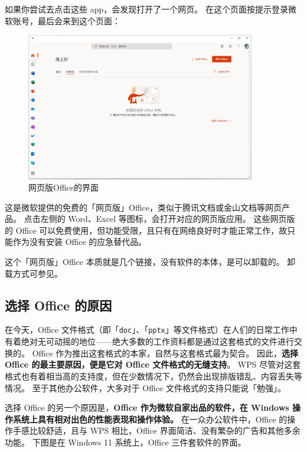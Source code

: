 如果你尝试去点击这些 app，会发现打开了一个网页。
在这个页面按提示登录微软账号，最后会来到这个页面：

\begin{figure}[htb!]
  \centering
  \includegraphics[width=10cm]{assets/Office_Web.png}
  \caption{网页版Office的界面}
  \label{Office_Web}
\end{figure}

这是微软提供的免费的「网页版」Office，类似于腾讯文档或金山文档等网页产品。
点击左侧的 Word、Excel 等图标，会打开对应的网页版应用。
这些网页版的 Office 可以免费使用，但功能受限，且只有在网络良好时才能正常工作，故只能作为没有安装 Office 的应急替代品。

这个「网页版」Office 本质就是几个链接，没有软件的本体，是可以卸载的。
卸载方式可参见。

\subsection{选择 Office 的原因}

在今天，Office 文件格式（即「\verb|doc|」、「\verb|pptx|」等文件格式）在人们的日常工作中有着绝对无可动摇的地位——绝大多数的工作资料都是通过这套格式的文件进行交换的。
Office 作为推出这套格式的本家，自然与这套格式最为契合。
因此，\textbf{选择 Office 的最主要原因，便是它对 Office 文件格式的无缝支持}。
WPS 尽管对这套格式也有着相当高的支持度，但在少数情况下，仍然会出现排版错乱、内容丢失等情况。
至于其他办公软件，大多对于 Office 文件格式的支持只能说「勉强」。

选择 Office 的另一个原因是，\textbf{Office 作为微软自家出品的软件，在 Windows 操作系统上具有相对出色的性能表现和操作体验。}
在一众办公软件中，Office 的操作手感比较舒适，且与 WPS 相比，Office 界面简洁、没有繁杂的广告和其他多余功能。
下图是在 Windows 11 系统上，Office 三件套软件的界面。

